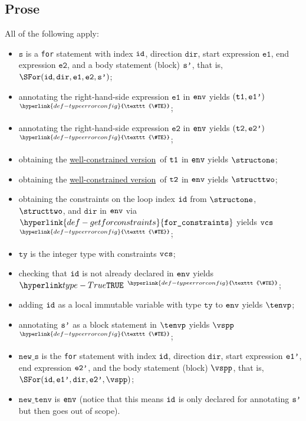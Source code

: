 \documentclass{book}
\newcommand\TypeErrorConfig[0]{\hyperlink{def-typeerrorconfig}{\texttt{\#TE}}}
\newcommand\ProseOrTypeError[0]{\hyperlink{def-proseortypeerror}{$^{\TypeErrorConfig}$}}
\newcommand\getforconstraints[0]{\hyperlink{def-getforconstraints}{\texttt{for\_constraints}}}
\newcommand\wellconstrainedversion[0]{\hyperlink{def-towellconstrained}{well-constrained version}}
\newcommand\newtenv[0]{\texttt{new\_tenv}}
\newcommand\veone[0]{\texttt{e1}}
\newcommand\vetwo[0]{\texttt{e2}}
\newcommand\vs[0]{\texttt{s}}
\newcommand\tty[0]{\texttt{ty}}
\newcommand\news[0]{\texttt{new\_s}}
\newcommand\dir[0]{\texttt{dir}}
\begin{document}
\subsection{Prose}
All of the following apply:
\begin{itemize}
  \item $\vs$ is a \texttt{for} statement with index $\texttt{id}$, direction $\dir$, start expression
        $\veone$, end expression $\vetwo$, and a body statement (block) $\texttt{s'}$, that is, $\SFor(\id, \dir, \veone, \vetwo, \vsp)$;
  \item annotating the right-hand-side expression $\veone$ in $\texttt{env}$ yields $(\texttt{t1}, \texttt{e1'})$ \ProseOrTypeError;
  \item annotating the right-hand-side expression $\vetwo$ in $\texttt{env}$ yields $(\texttt{t2}, \texttt{e2'})$ \ProseOrTypeError;
  \item obtaining the \wellconstrainedversion\ of $\texttt{t1}$ in $\texttt{env}$ yields $\structone$;
  \item obtaining the \wellconstrainedversion\ of $\texttt{t2}$ in $\texttt{env}$ yields $\structtwo$;
  \item obtaining the constraints on the loop index $\texttt{id}$ from $\structone$, $\structtwo$, and $\dir$ in $\texttt{env}$
        via $\getforconstraints$ yields $\texttt{vcs}$ \ProseOrTypeError;
  \item $\tty$ is the integer type with constraints $\texttt{vcs}$;
  \item checking that $\texttt{id}$ is not already declared in $\texttt{env}$ yields $\True$ \ProseOrTypeError;
  \item adding $\texttt{id}$ as a local immutable variable with type $\tty$ to $\texttt{env}$ yields $\tenvp$;
  \item annotating $\texttt{s'}$ as a block statement in $\tenvp$ yields $\vspp$ \ProseOrTypeError;
  \item $\news$ is the \texttt{for} statement with index $\texttt{id}$, direction $\dir$, start expression $\texttt{e1'}$,
        end expression $\texttt{e2'}$, and the body statement (block) $\vspp$, that is, \\
        $\SFor(\id, \veonep, \dir, \vetwop, \vspp)$;
  \item $\newtenv$ is $\texttt{env}$ (notice that this means $\texttt{id}$ is only declared for annotating $\texttt{s'}$ but then goes
        out of scope).
\end{itemize}
\end{document}
